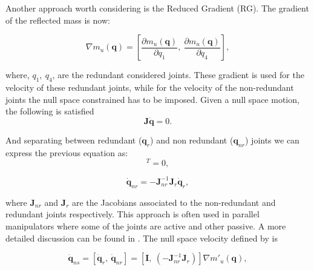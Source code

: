 Another approach worth considering is the Reduced Gradient (RG). 
The gradient of the reflected mass is now:

\begin{equation}
\nabla m_u(\mathbf{q}) = \left[
\frac{\partial {m_u(\mathbf{q})}}{\partial {q_1}}, \   \frac{\partial {m_u(\mathbf{q})}}{\partial {q_4}} \right], \label{eq:grad_refl_mass_RG}
\end{equation}

where,  $q_1 , \ q_4$,  are the redundant considered joints. These gradient is used for the velocity of these redundant joints, while for the velocity of the non-redundant joints the null space constrained has to be imposed. Given a null space motion, the following is satisfied
\begin{equation}
\mathbf{J} \dot{\mathbf{q}} = 0 .
\label{eq:ns_motion}
\end{equation}

And separating between redundant (${\mathbf{q}}_{r}$) and non redundant (${\mathbf{q}}_{nr}$) joints we can express the previous equation as:
\begin{equation}
[\mathbf{J}_r, \ \mathbf{J}_{nr}] [\mathbf{\dot{q}}_r, \  \dot{\mathbf{q}}_{nr}]^T = 0    ,
\label{eq:}
\end{equation}

\begin{equation}
\dot{\mathbf{q}}_{nr} =  - \mathbf{J}_{nr}^{-1} \mathbf{J}_r \mathbf{\dot{q}}_r    ,
\label{eq:ns_constraint}
\end{equation}

where $\mathbf{J}_{nr}$ and $\mathbf{J}_{r}$ are the Jacobians associated to the non-redundant and redundant joints respectively. This approach is often used in parallel manipulators where some of the joints are active and other passive. A more detailed discussion can be found in \cite{Murray:1994:MIR:561828}. The null space velocity defined by \cite{reduced_gradient} is

\begin{equation}
\mathbf{\dot{q}}_{ns} = \left[\mathbf{\dot{q}}_{r}, \  \mathbf{\dot{q}}_{nr} \right ] 
= \left[\mathbf{I}, \ (-\mathbf{J}_{nr}^{-1} \mathbf{J}_r)  \right ]  \nabla m'_u(\mathbf{q}),
\label{eq:ns_velocity_RG}
\end{equation}




